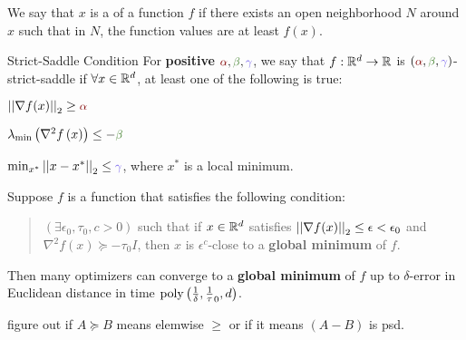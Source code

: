 \documentclass[11pt]{article}
\begin{document}


\begin{definition}
	We say that $x$ is a  of a function $f$ if there exists an open neighborhood $N$ around $x$ such that in $N$, the function values are at least $f(x)$. 
\end{definition}

\begin{itemdefinition}[-1em]{Strict-Saddle Condition}{
	For \textbf{positive} $\mred \alpha, \mgreen \beta, \mblue \gamma$, we say that $f: \mathbb{R}^d \to \mathbb{R}$ is $(\mred \alpha, \mgreen \beta, \mblue \gamma)$-strict-saddle if $\forall x \in \mathbb{R}^d$, at least one of the following is true:}
	
	\item $\norm{ \nabla f(x) } \geq \mred \alpha$ 
	
	\item $\lambda_{\text{min} }\lr{ \nabla^2 f\lr{x} } \leq - \mgreen \beta$
	
	\item $\min_{x^*}\norm{x - x^*} \leq \mblue \gamma$, where $x^*$ is a local minimum. 
\end{itemdefinition}

\begin{definition}
	Suppose $f$ is a function that satisfies the following condition: 
	
	\begin{quote}
	$(\exists \epsilon_0, \tau_0, c > 0)$ such that if $x \in \mathbb{R}^d$ satisfies $\left|\left| \nabla f(x) \right|\right|_{2} \leq \epsilon < \epsilon_0$ and $\nabla^2 f(x) \succeq - \tau_0 I$, then $x$ is $\epsilon^c$-close to a \textbf{global minimum} of $f$. 
	\end{quote}
	
	Then many optimizers can converge to a \textbf{global minimum }of $f$ up to $\delta$-error in Euclidean distance in time $\text{poly}\left( \frac{1}{\delta}, \frac{1}{\tau}_0, d \right)$. 

	 figure out if $A \succeq B$ means elemwise $\geq$ or if it means $(A - B)$ is psd. 
\end{definition}
\end{document}
